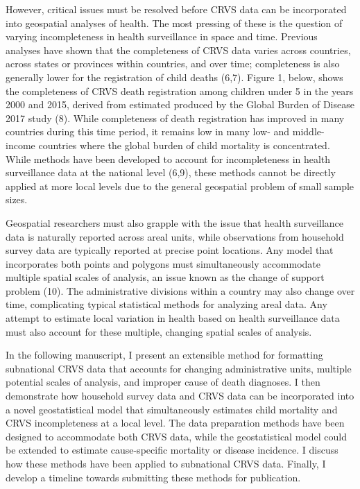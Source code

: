 \documentclass[
]{article}
\begin{document}
However, critical issues must be resolved before CRVS data can be incorporated into geospatial analyses of health. The most pressing of these is the question of varying incompleteness in health surveillance in space and time. Previous analyses have shown that the completeness of CRVS data varies across countries, across states or provinces within countries, and over time; completeness is also generally lower for the registration of child deaths (6,7). Figure 1, below, shows the completeness of CRVS death registration among children under 5 in the years 2000 and 2015, derived from estimated produced by the Global Burden of Disease 2017 study (8). While completeness of death registration has improved in many countries during this time period, it remains low in many low- and middle- income countries where the global burden of child mortality is concentrated. While methods have been developed to account for incompleteness in health surveillance data at the national level (6,9), these methods cannot be directly applied at more local levels due to the general geospatial problem of small sample sizes.

Geospatial researchers must also grapple with the issue that health surveillance data is naturally reported across areal units, while observations from household survey data are typically reported at precise point locations. Any model that incorporates both points and polygons must simultaneously accommodate multiple spatial scales of analysis, an issue known as the change of support problem (10). The administrative divisions within a country may also change over time, complicating typical statistical methods for analyzing areal data. Any attempt to estimate local variation in health based on health surveillance data must also account for these multiple, changing spatial scales of analysis.

In the following manuscript, I present an extensible method for formatting subnational CRVS data that accounts for changing administrative units, multiple potential scales of analysis, and improper cause of death diagnoses. I then demonstrate how household survey data and CRVS data can be incorporated into a novel geostatistical model that simultaneously estimates child mortality and CRVS incompleteness at a local level. The data preparation methods have been designed to accommodate both CRVS data, while the geostatistical model could be extended to estimate cause-specific mortality or disease incidence. I discuss how these methods have been applied to subnational CRVS data. Finally, I develop a timeline towards submitting these methods for publication.
\end{document}
